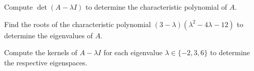 \begin{applicationActivities}{3}{27}
\begin{activity}{15}
\begin{subactivity}
 Compute $\det (A-\lambda I)$ to determine the characteristic polynomial of $A$.
\end{subactivity}
\begin{subactivity}
Find the roots of the characteristic polynomial
\((3-\lambda)(\lambda^2-4\lambda-12)\)
to determine the eigenvalues of $A$.
\end{subactivity}
\begin{subactivity}
Compute the kernels of $A-\lambda I$ for each eigenvalue
$\lambda\in\{-2,3,6\}$ to determine the respective eigenspaces.
\end{subactivity}
\end{activity}

\end{applicationActivities}
